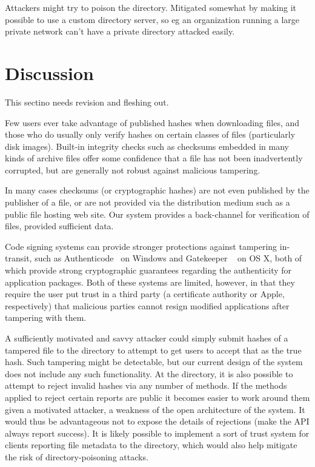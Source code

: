 \documentclass[letterpaper,twocolumn,10pt]{article}
\begin{document}
Attackers might try to poison the directory. Mitigated somewhat by making
it possible to use a custom directory server, so eg an organization running a large private
network can't have a private directory attacked easily.

\section{Discussion}

This sectino needs revision and fleshing out.

Few users ever take advantage of published hashes when downloading files, and those who do usually only verify hashes on certain classes of files (particularly disk images). Built-in integrity checks such as checksums embedded in many kinds of archive files offer some confidence that a file has not been inadvertently corrupted, but are generally not robust against malicious tampering.

In many cases checksums (or cryptographic hashes) are not even published by the publisher of a file, or are not provided via the distribution medium such as a public file hosting web site. Our system provides a back-channel for verification of files, provided sufficient data.

Code signing systems can provide stronger protections against tampering in-transit, such as Authenticode~\cite{Authenticode} on Windows and Gatekeeper ~\cite{Gatekeeper} on OS X, both of which provide strong cryptographic guarantees regarding the authenticity for application packages. Both of these systems are limited, however, in that they require the user put trust in a third party (a certificate authority or Apple, respectively) that malicious parties cannot resign modified applications after tampering with them.

A sufficiently motivated  and savvy attacker could simply submit hashes of a tampered file to the directory to attempt to get users to accept that as the true hash. Such tampering might be detectable, but our current design of the system does not include any such functionality. At the directory, it is also possible to attempt to reject invalid hashes via any number of methods. If the methods applied to reject certain reports are public it becomes easier to work around them given a motivated attacker, a weakness of the open architecture of the system. It would thus be advantageous not to expose the details of rejections (make the API always report success). It is likely possible to implement a sort of trust system for clients reporting file metadata to the directory, which would also help mitigate the risk of directory-poisoning attacks.
\end{document}
